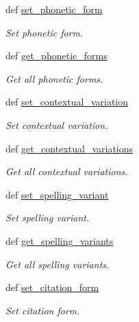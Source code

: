 \begin{DoxyCompactItemize}
def \hyperlink{classlmf_1_1src_1_1core_1_1lexical__entry_1_1_lexical_entry_a475be85222f2a0b4fc6f9e218675fc47}{set\+\_\+phonetic\+\_\+form}
\begin{DoxyCompactList}\small\item\em Set phonetic form. \end{DoxyCompactList}\item 
def \hyperlink{classlmf_1_1src_1_1core_1_1lexical__entry_1_1_lexical_entry_ad341d1cfa5e60593a7bce27a5eec8b98}{get\+\_\+phonetic\+\_\+forms}
\begin{DoxyCompactList}\small\item\em Get all phonetic forms. \end{DoxyCompactList}\item 
def \hyperlink{classlmf_1_1src_1_1core_1_1lexical__entry_1_1_lexical_entry_a2e094703f5eb2e25c5d9c4aabf67ae72}{set\+\_\+contextual\+\_\+variation}
\begin{DoxyCompactList}\small\item\em Set contextual variation. \end{DoxyCompactList}\item 
def \hyperlink{classlmf_1_1src_1_1core_1_1lexical__entry_1_1_lexical_entry_aa2a404954cb0bd85ddfeec53db637dd3}{get\+\_\+contextual\+\_\+variations}
\begin{DoxyCompactList}\small\item\em Get all contextual variations. \end{DoxyCompactList}\item 
def \hyperlink{classlmf_1_1src_1_1core_1_1lexical__entry_1_1_lexical_entry_a091b34e06640680cc167472c519b5c3a}{set\+\_\+spelling\+\_\+variant}
\begin{DoxyCompactList}\small\item\em Set spelling variant. \end{DoxyCompactList}\item 
def \hyperlink{classlmf_1_1src_1_1core_1_1lexical__entry_1_1_lexical_entry_a72701906e798fbc34c6ef6ea177901e8}{get\+\_\+spelling\+\_\+variants}
\begin{DoxyCompactList}\small\item\em Get all spelling variants. \end{DoxyCompactList}\item 
def \hyperlink{classlmf_1_1src_1_1core_1_1lexical__entry_1_1_lexical_entry_a13f7f29967c9ac00d8453578904cc394}{set\+\_\+citation\+\_\+form}
\begin{DoxyCompactList}\small\item\em Set citation form. \end{DoxyCompactList}\item 

\end{DoxyCompactItemize}
